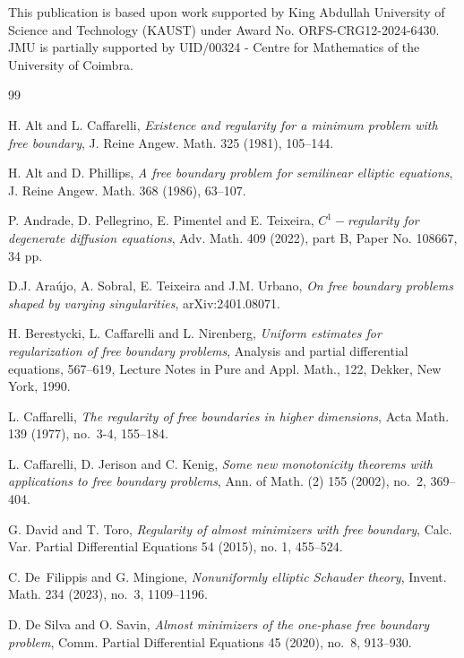 \documentclass[reqno,11pt]{amsart}
\newcommand{\1}{\mathds{1}}  %
\numberwithin{equation}{section}
\begin{document}
\bigskip

{\small {} This publication is based upon work supported by King Abdullah University of Science and Technology (KAUST) under Award No. ORFS-CRG12-2024-6430. JMU is partially supported by UID/00324 - Centre for Mathematics of the University of Coimbra.}

\bigskip



\begin{thebibliography}{99} 

 H. Alt and L. Caffarelli,  
\textit{Existence and regularity for a minimum problem with free boundary},
J. Reine Angew. Math. 325 (1981), 105--144.

 H. Alt and D. Phillips, 
\textit{A free boundary problem for semilinear elliptic equations},  
J. Reine Angew. Math. 368 (1986), 63--107.

 P. Andrade, D. Pellegrino, E. Pimentel and E. Teixeira,
\textit{$C^1-$regularity for degenerate diffusion equations},  
Adv. Math. 409 (2022), part B, Paper No. 108667, 34 pp. 

 D.J. Araújo, A. Sobral, E. Teixeira and J.M. Urbano, 
\textit{On free boundary problems shaped by varying singularities}, 
arXiv:2401.08071. 

 H. Berestycki, L. Caffarelli and L. Nirenberg, 
\textit{Uniform estimates for regularization of free boundary problems},  
Analysis and partial differential equations, 567–619, Lecture Notes in Pure and Appl. Math., 122, Dekker, New York, 1990. 

 L. Caffarelli, 
\textit{The regularity of free boundaries in higher dimensions}, 
Acta Math. 139 (1977), no.~3-4, 155--184.

 L. Caffarelli, D. Jerison and C. Kenig, 
\textit{Some new monotonicity theorems with applications to free boundary problems}, 
Ann. of Math. (2) 155 (2002), no.~2, 369--404.

 G. David and T. Toro,
\textit{Regularity of almost minimizers with free boundary}, 
Calc. Var. Partial Differential Equations 54 (2015), no. 1, 455--524.

 C. De~Filippis and G. Mingione, 
\textit{Nonuniformly elliptic Schauder theory}, 
Invent. Math. 234 (2023), no.~3, 1109--1196.

 D. De Silva and O. Savin, 
\textit{Almost minimizers of the one-phase free boundary problem}, 
Comm. Partial Differential Equations 45 (2020), no.~8, 913--930.


\end{thebibliography}
\end{document}

